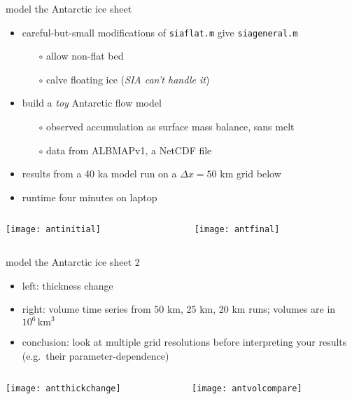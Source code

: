 \begin{frame}{model the Antarctic ice sheet}

\normalsize
\begin{itemize}
\item careful-but-small modifications of \texttt{siaflat.m} give \texttt{siageneral.m}
  \begin{itemize}
  \item[$\circ$] allow non-flat bed
  \item[$\circ$] calve floating ice (\emph{SIA can't handle it})
  \end{itemize}
\item build a \emph{toy} Antarctic flow model
  \begin{itemize}
  \item[$\circ$] observed accumulation as surface mass balance, sans melt
  \item[$\circ$] data from ALBMAPv1, a NetCDF file
  \end{itemize}
\item results from a 40 ka model run on a $\Delta x=50$ km grid below
\item runtime four minutes on laptop
\end{itemize}

\bigskip

\begin{columns}
\begin{column}{0.4\textwidth}
\texttt{[image: antinitial]}
\end{column}
\begin{column}{0.55\textwidth}
\texttt{[image: antfinal]}
\end{column}
\end{columns}
\end{frame}


\begin{frame}{model the Antarctic ice sheet 2}

\normalsize
\begin{itemize}
\item left: thickness change
\item right: volume time series from 50 km, 25 km, 20 km runs; volumes are in $10^6\,\text{km}^3$
\item conclusion:  \alert{look at multiple grid resolutions} before interpreting your results (e.g.~their parameter-dependence)
\end{itemize}

\bigskip
\begin{columns}
\begin{column}{0.55\textwidth}
\texttt{[image: antthickchange]}
\end{column}
\begin{column}{0.45\textwidth}
\texttt{[image: antvolcompare]}
\end{column}
\end{columns}
\end{frame}